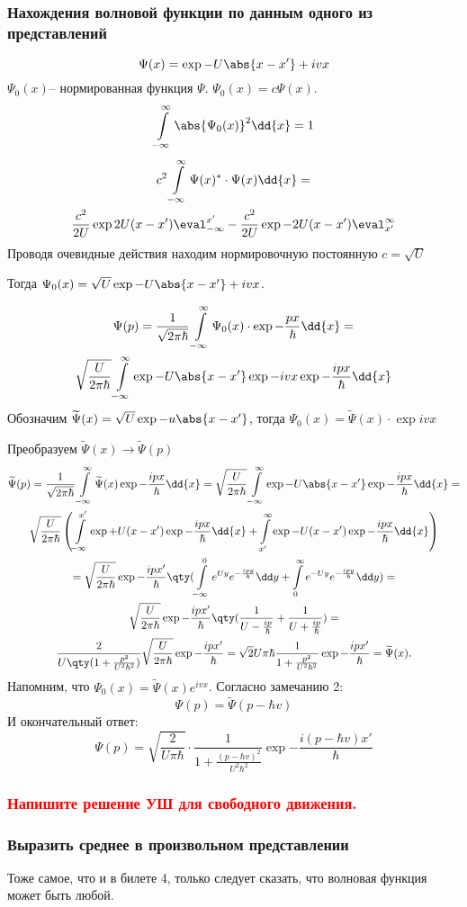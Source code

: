 \subsubsection{Нахождения волновой функции по данным одного из представлений}

$$\Psi(x)= \exp{-U\abs{x-x'} +ivx  }$$
$\Psi_0(x)$-- нормированная функция $\Psi$. $\Psi_0(x)=c\Psi(x)$.
$$\infint \abs{\Psi_0(x)}^2 \dd{x}=1$$
\begin{gather*}
	c^2\infint \Psi(x)^*\cdot\Psi(x)\dd{x}=
	\\ \frac{c^2}{2U}\exp{2U(x-x')}\eval_{-\infty}^{x'}- 
	\frac{c^2}{2U}\exp{-2U(x-x')}
	\eval^{\infty}_{x'}
\end{gather*}
Проводя очевидные действия находим нормировочную постоянную $c=\sqrt{U}$

Тогда $\Psi_0(x)=\sqrt{U}\exp{-U\abs{x-x'}+ivx}$.

\begin{gather*}
\Psi(p)=\frac{1}{\sqrt{2\pi\hbar}}\infint \Psi_0(x)\cdot\exp{-\frac{px}{\hbar}} \dd{x}=\\
\sqrt\frac{U}{2 \pi \hbar } \infint \exp{-U\abs{x-x'}}\exp{-ivx}\exp{-\frac{ipx}{\hbar}} \dd{x}
\end{gather*}
Обозначим $\tilde{\Psi}(x)=\sqrt{U} \exp{-u\abs{x-x'}}$,
 тогда $\Psi_0(x)=\tilde{\Psi}(x)\cdot\exp{ivx}$

Преобразуем $\tilde{\Psi}(x)\longrightarrow \tilde{\Psi}(p)$ 
\begin{gather*}
	\tilde{\Psi}(p)=\frac{1}{\sqrt{2\pi\hbar}}\infint\tilde\Psi(x)\exp{-\frac{ipx}{\hbar}} \dd{x} =\sqrt{\frac{U}{2 \pi \hbar}} \infint \exp{-U\abs{x-x'}}\exp{-\frac{ipx}{\hbar}}\dd{x} =\\
	\sqrt{\frac{U}{2 \pi \hbar}} \left(
	\int\limits_{-\infty}^{x'} \exp{+U (x-x')}\exp{-\frac{ipx}{\hbar}}\dd{x} 
	+
	\int\limits^{\infty}_{x'} \exp{-U (x-x')}\exp{-\frac{ipx}{\hbar}}\dd{x}
	\right)\\=
	\sqrt{\frac{U}{2 \pi \hbar }}\exp{-\frac{ipx' }{\hbar}}
	\qty
	(\int\limits_{-\infty}^0 e^{Uy} e^{-\frac{ipy}{\hbar}}\dd y+
	\int\limits^{\infty}_0 e^{-Uy} e^{-\frac{ipy}{\hbar}}\dd y
	 )
	 =\\
	 \sqrt{\frac{U}{2 \pi \hbar}} \exp{-\frac{ipx' }{\hbar}} 
	 \qty(\frac{1}{U-\frac{ip}{\hbar}} + \frac{1}{U+\frac{ip}{\hbar}})=\\
	 \frac{2}{U\qty(1+\frac{p^2}{U^2\hbar^2})}\sqrt{\frac{U}{2 \pi \hbar}} \exp{-\frac{ipx'}{\hbar}}=\sqrt{2}{U \pi \hbar} \frac{1}{1+\frac{p^2}{U^2\hbar^2}}\exp{-\frac{ipx' }{\hbar}}=\tilde {\Psi}(x). 
\end{gather*}
Напомним, что $\Psi_0(x)=\tilde\Psi(x)e^{ivx}$. Согласно замечанию 2:
	 $$\Psi(p)=\tilde{\Psi}(p-\hbar v)$$
И окончательный ответ:
	 $$\Psi(p)=\sqrt{\frac{2}{U\pi\hbar}}\cdot\frac{1}{1+\frac{(p-\hbar v)^2}{U^2\hbar^2}}\exp{-\frac{i(p-\hbar v)x' }{\hbar}} $$
\subsubsection{\textcolor{red} {Напишите решение УШ для свободного движения.} }

\subsubsection{{Выразить среднее в произвольном представлении} }

Тоже самое, что и в билете 4, только следует сказать, что волновая функция может быть любой.